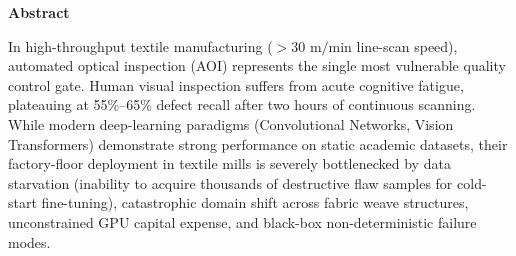 \documentclass[10pt,a4paper]{article}
\begin{document}
\begin{center}
\textbf{\large Abstract}
\end{center}
\vspace{-0.4em}
\noindent
In high-throughput textile manufacturing ($> 30\text{ m/min}$ line-scan speed), automated optical inspection (AOI) represents the single most vulnerable quality control gate. Human visual inspection suffers from acute cognitive fatigue, plateauing at 55\%--65\% defect recall after two hours of continuous scanning. While modern deep-learning paradigms (Convolutional Networks, Vision Transformers) demonstrate strong performance on static academic datasets, their factory-floor deployment in textile mills is severely bottlenecked by data starvation (inability to acquire thousands of destructive flaw samples for cold-start fine-tuning), catastrophic domain shift across fabric weave structures, unconstrained GPU capital expense, and black-box non-deterministic failure modes.
\end{document}
